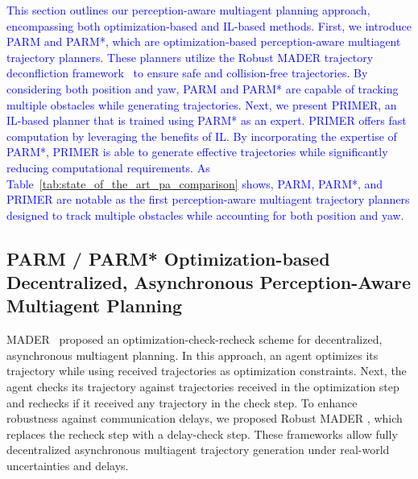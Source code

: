 \textcolor{blue}{
This section outlines our perception-aware multiagent planning approach, encompassing both optimization-based and IL-based methods.
First, we introduce PARM and PARM*, which are optimization-based perception-aware multiagent trajectory planners. These planners utilize the Robust MADER trajectory deconfliction framework~\cite{kondo2023robust} to ensure safe and collision-free trajectories. By considering both position and yaw, PARM and PARM* are capable of tracking multiple obstacles while generating trajectories.
Next, we present PRIMER, an IL-based planner that is trained using PARM* as an expert. PRIMER offers fast computation by leveraging the benefits of IL. By incorporating the expertise of PARM*, PRIMER is able to generate effective trajectories while significantly reducing computational requirements.
As Table~\ref{tab:state_of_the_art_pa_comparison} shows, PARM, PARM*, and PRIMER are notable as the first perception-aware multiagent trajectory planners designed to track multiple obstacles while accounting for both position and yaw.}


\subsection{PARM / PARM* \textemdash Optimization-based Decentralized, Asynchronous Perception-Aware Multiagent Planning}

MADER~\cite{tordesillas2020mader} proposed an optimization-check-recheck scheme for decentralized, asynchronous multiagent planning.
In this approach, an agent optimizes its trajectory while using received trajectories as optimization constraints.
Next, the agent checks its trajectory against trajectories received in the optimization step and rechecks if it received any trajectory in the check step.
To enhance robustness against communication delays, we proposed Robust MADER \cite{kondo2023robust}, which replaces the recheck step with a delay-check step. 
These frameworks allow fully decentralized asynchronous multiagent trajectory generation under real-world uncertainties and delays.

